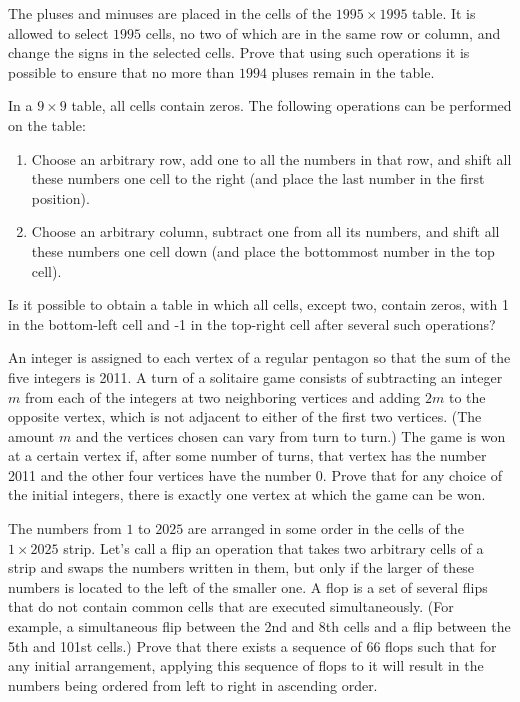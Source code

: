 \begin{problem} 
    The pluses and minuses are placed in the cells of the  $1995 \times 1995$ table. It is allowed to select $1995$ cells, no two of which are in the same row or column, and change the signs in the selected cells. Prove that using such operations it is possible to ensure that no more than $1994$ pluses remain in the table.
\end{problem}

\begin{problem} 
In a $9\times 9$ table, all cells contain zeros. The following operations can be performed on the table:
\begin{enumerate}
    \item Choose an arbitrary row, add one to all the numbers in that row, and shift all these numbers one cell to the right (and place the last number in the first position).
    \item Choose an arbitrary column, subtract one from all its numbers, and shift all these numbers one cell down (and place the bottommost number in the top cell).
\end{enumerate}
Is it possible to obtain a table in which all cells, except two, contain zeros, with 1 in the bottom-left cell and -1 in the top-right cell after several such operations?
\end{problem}
\begin{problem} [USAMO 2011]
An integer is assigned to each vertex of a regular pentagon so that the sum of the five integers is 2011. A turn of a solitaire game consists of subtracting an integer $m$ from each of the integers at two neighboring vertices and adding $2m$ to the opposite vertex, which is not adjacent to either of the first two vertices. (The amount $m$ and the vertices chosen can vary from turn to turn.) The game is won at a certain vertex if, after some number of turns, that vertex has the number 2011 and the other four vertices have the number 0. Prove that for any choice of the initial integers, there is exactly one vertex at which the game can be won.
\end{problem} 
\begin{problem} [239 olympiad 2025]
The numbers from $1$ to $2025$ are arranged in some order in the cells of the $1 \times 2025$ strip. Let's call a flip an operation that takes two arbitrary cells of a strip and swaps the numbers written in them, but only if the larger of these numbers is located to the left of the smaller one. A flop is a set of several flips that do not contain common cells that are executed simultaneously. (For example, a simultaneous flip between the 2nd and 8th cells and a flip between the 5th and 101st cells.) Prove that there exists a sequence of $66$ flops such that for any initial arrangement, applying this sequence of flops to it will result in the numbers being ordered from left to right in ascending order.
\end{problem}
